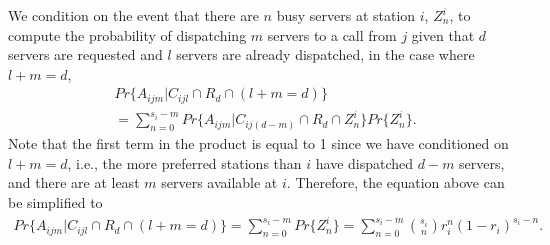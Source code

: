 \documentclass[11pt]{article}\topmargin 0mm
\begin{document}
We condition on the event that there are $n$ busy servers at
station $i$, $Z_n^i$, to compute the probability of dispatching
$m$ servers to a call from $j$ given that $d$ servers are
requested and $l$ servers are already dispatched, in the case
where $l+m=d$,
\begin{equation}
\begin{split}
& Pr\{A_{ijm}|C_{ijl} \cap R_d \cap (l+m=d) \} \\
& = \sum_{n=0}^{s_i-m} Pr\{A_{ijm}|C_{ij(d-m)} \cap R_d \cap Z_n^i \} Pr\{Z_n^i\}.
\end{split}
\end{equation}
Note that the first term in the product is equal to 1 since we
have conditioned on $l+m=d$, i.e., the more preferred stations
than $i$ have dispatched $d-m$ servers, and there are at least
$m$ servers available at $i$. Therefore, the equation above can
be simplified to
\begin{equation}
\label{eq:P(Aijm|Cijl&l+m=d)}
\begin{split}
Pr\{A_{ijm}|C_{ijl} \cap R_d \cap (l+m=d) \} = \sum_{n=0}^{s_i-m} Pr\{Z_n^i\} = \sum_{n=0}^{s_i-m} {s_i \choose n} r_i^n(1-r_i)^{s_i-n}.
\end{split}
\end{equation}
\end{document}
